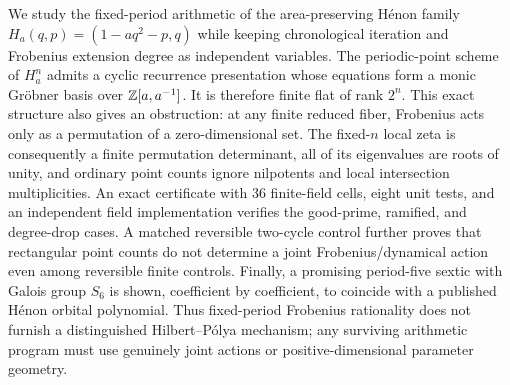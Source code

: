 We study the fixed-period arithmetic of the area-preserving H\'enon family
$H_a(q,p)=(1-aq^2-p,q)$ while keeping chronological iteration and Frobenius
extension degree as independent variables.  The periodic-point scheme of
$H_a^n$ admits a cyclic recurrence presentation whose equations form a monic
Gr\"obner basis over $\mathbb Z[a,a^{-1}]$.  It is therefore finite flat of rank
$2^n$.  This exact structure also gives an obstruction: at any finite reduced
fiber, Frobenius acts only as a permutation of a zero-dimensional set.  The
fixed-$n$ local zeta is consequently a finite permutation determinant, all of
its eigenvalues are roots of unity, and ordinary point counts ignore
nilpotents and local intersection multiplicities.  An exact certificate with
36 finite-field cells, eight unit tests, and an independent field
implementation verifies the good-prime, ramified, and degree-drop cases.  A
matched reversible two-cycle control further proves that rectangular point
counts do not determine a joint Frobenius/dynamical action even among
reversible finite controls.  Finally, a promising
period-five sextic with Galois group $S_6$ is shown, coefficient by coefficient,
to coincide with a published H\'enon orbital polynomial.  Thus fixed-period
Frobenius rationality does not furnish a distinguished Hilbert--P\'olya
mechanism; any surviving arithmetic program must use genuinely joint actions
or positive-dimensional parameter geometry.
